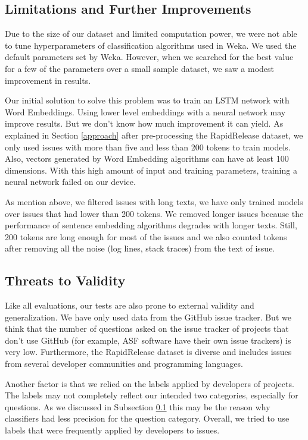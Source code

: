 \documentclass[conference]{IEEEtran}
\begin{document}
\subsection{Limitations and Further Improvements}
\label{limits}
Due to the size of our dataset and limited computation power, we were not able to tune hyperparameters of 
classification algorithms used in Weka. We used the default parameters set by Weka. 
However, when we searched for the best value for a few of the parameters over a small sample dataset,
we saw a modest improvement in results.

Our initial solution to solve this problem was to train an LSTM network with Word Embeddings. Using lower level 
embeddings with a neural network may improve results. But we don't know how much improvement it can yield.
As explained in Section \ref{approach} after pre-processing the RapidRelease dataset, we only used issues with 
more than five and less than 200 tokens to train models. Also, vectors generated by Word Embedding algorithms 
can have at least 100 dimensions. With this high amount of input and training parameters, training a neural network 
failed on our device. 

As mention above, we filtered issues with long texts, we have only trained models over issues that had lower than 200 
tokens. We removed longer issues because the performance of sentence embedding algorithms degrades 
with longer texts. Still, 200 tokens are long enough for most of the issues and we also counted tokens after 
removing all the noise (log lines, stack traces) from the text of issue.

\subsection{Threats to Validity}
Like all evaluations, our tests are also prone to external validity and generalization. We have only used data from 
the GitHub issue tracker. But we think that the number of questions asked on the issue tracker of projects that don't 
use GitHub (for example, ASF software have their own issue trackers) is very low. 
Furthermore, the RapidRelease dataset is diverse and includes issues from several developer communities 
and programming languages. 

Another factor is that we relied on the labels applied by developers of projects. The labels may not completely 
reflect our intended two categories, especially for questions. As we discussed in Subsection \ref{limits} this 
may be the reason why classifiers had less precision for the question category. Overall, we tried to use labels 
that were frequently applied by developers to issues.
\end{document}
